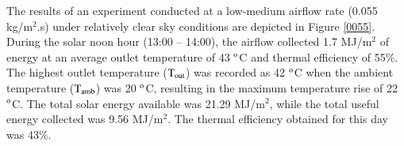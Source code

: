 The results of an experiment conducted at a low-medium airflow rate (0.055 kg/m$^2$.s) under relatively clear sky conditions are depicted in Figure \ref{0055}. During the solar noon hour (13:00 -- 14:00), the airflow collected 1.7 MJ/m$^2$ of energy at an average outlet temperature of 43 $^{\rm{o}}$C and thermal efficiency of 55\%. The highest outlet temperature ($\rm{T_{out}}$) was recorded as 42 $^{\rm{o}}$C when the ambient temperature ($\rm{T_{amb}}$) was 20 $^{\rm{o}}$C, resulting in the maximum temperature rise of 22 $^{\rm{o}}$C. The total solar energy available was 21.29 MJ/m$^2$, while the total useful energy collected was 9.56 MJ/m$^2$. The thermal efficiency obtained for this day was 43\%.




